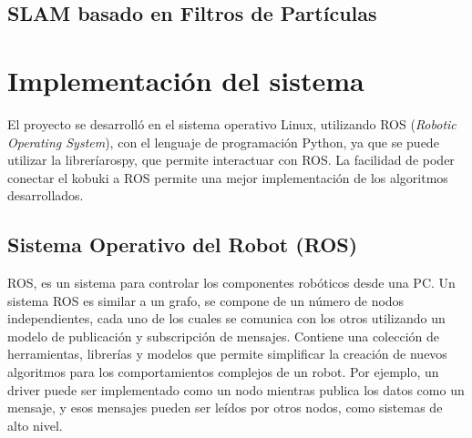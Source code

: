 \subsection{SLAM basado en Filtros de Part\'iculas}

\section{Implementaci\'on del sistema}
El proyecto se desarrolló en el sistema operativo Linux, utilizando ROS 
(\textit{Robotic Operating System}), con el lenguaje de programación Python, ya que 
se puede utilizar la libreríarospy, que permite interactuar con ROS. La facilidad de
poder conectar el kobuki a ROS permite una mejor implementación de los
algoritmos desarrollados.

\subsection{Sistema Operativo del Robot (ROS)}
ROS, es un sistema para controlar los componentes robóticos desde una PC. Un sistema 
ROS es similar a un grafo, se compone de un número de nodos independientes, cada uno 
de los cuales se comunica con los otros utilizando un modelo de publicación y subscripción 
de mensajes. Contiene una colección de herramientas, librerías y modelos que permite 
simplificar la creación de nuevos algoritmos para los comportamientos complejos de un 
robot. Por ejemplo, un driver puede ser implementado como un nodo mientras publica los datos 
como un mensaje, y esos mensajes pueden ser leídos por otros nodos, como sistemas de alto nivel.



